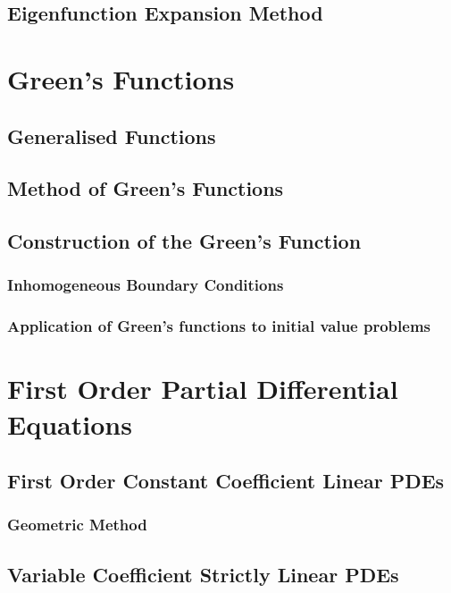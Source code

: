 \documentclass{article}
\theoremstyle{plain}
\theoremstyle{definition}
\numberwithin{equation}{section}
\begin{document}
\subsection{Eigenfunction Expansion Method}

\section{Green's Functions}

\subsection{Generalised Functions}

\subsection{Method of Green's Functions}

\subsection{Construction of the Green's Function}

\subsubsection{Inhomogeneous Boundary Conditions}

\subsubsection{Application of Green's functions to initial value problems}

\section{First Order Partial Differential Equations}

\subsection{First Order Constant Coefficient Linear PDEs}

\subsubsection{Geometric Method}

\subsection{Variable Coefficient Strictly Linear PDEs}
\end{document}
